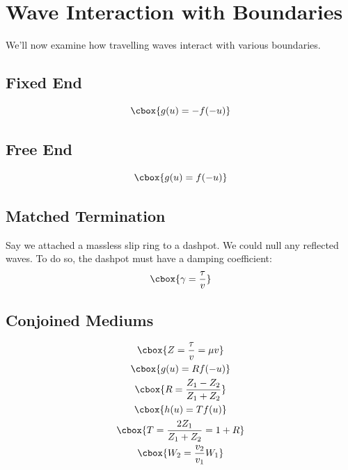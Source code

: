 \documentclass{hw}
\begin{document}
\section{Wave Interaction with Boundaries}
We'll now examine how travelling waves interact with various boundaries.

\subsection{Fixed End}
\[\cbox{g(u) = -f(-u)}\]

\subsection{Free End}
\[\cbox{g(u) = f(-u)}\]

\subsection{Matched Termination}
Say we attached a massless slip ring to a dashpot. We could null any reflected
waves. To do so, the dashpot must have a damping coefficient:
\[\cbox{
  \gamma = \frac{\tau}{v}
}\]

\subsection{Conjoined Mediums}
\begin{gather*}
  \cbox{Z = \frac{\tau}{v} = \mu v} \\
  \cbox{g(u) = Rf(-u)} \\
  \cbox{R = \frac{Z_1 - Z_2}{Z_1 + Z_2}} \\
  \cbox{h(u) = Tf(u)} \\
  \cbox{T = \frac{2Z_1}{Z_1 + Z_2} = 1 + R} \\
  \cbox{W_2 = \frac{v_2}{v_1}W_1}
\end{gather*}
\end{document}
